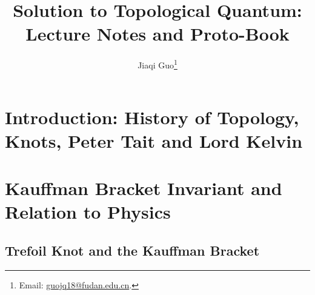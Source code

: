 \documentclass{book}
\title{Solution to Topological Quantum: Lecture Notes and Proto-Book}
\author{Jiaqi Guo\footnote{Email: \href{mailto:guojq18@fudan.edu.cn}{guojq18@fudan.edu.cn}.}}
\begin{document}
\maketitle
\tableofcontents

\chapter{Introduction: History of Topology, Knots, Peter Tait and Lord Kelvin}

\chapter{Kauffman Bracket Invariant and Relation to Physics}
\section{Trefoil Knot and the Kauffman Bracket}
\end{document}
